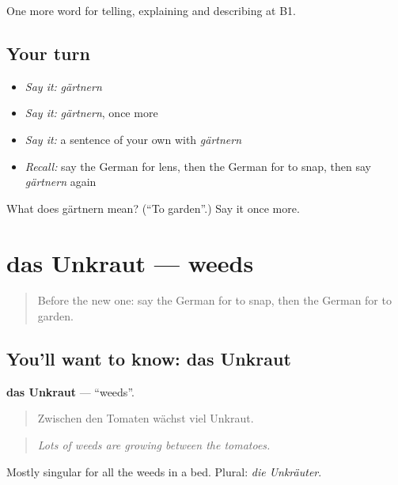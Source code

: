 \begin{grammarlens}[title={What you've built}]
One more word for telling, explaining and describing at B1.
\end{grammarlens}

\subsection*{Your turn}
\begin{itemize}
\raggedright
  \item \emph{Say it:} \emph{gärtnern}
  \item \emph{Say it:} \emph{gärtnern}, once more
  \item \emph{Say it:} a sentence of your own with \emph{gärtnern}
  \item \emph{Recall:} say the German for lens, then the German for to snap, then say \emph{gärtnern} again
\end{itemize}

\begin{tcolorbox}[breakable,colback=teal!4,colframe=teal!35!black,title={Before you move on}]
What does gärtnern mean? (\textquotedblleft{}To garden\textquotedblright{}.) Say it once more.
\end{tcolorbox}
\section[das Unkraut]{das Unkraut — weeds}

\label{lesson:GE-C503-unkraut}



\begin{quote}
Before the new one: say the German for to snap, then the German for to garden.
\end{quote}

\subsection*{You'll want to know: das Unkraut}
\textbf{das Unkraut} — \textquotedblleft{}weeds\textquotedblright{}.

\begin{quote}
Zwischen den Tomaten wächst viel Unkraut.
\end{quote}

\begin{quote}
\emph{Lots of weeds are growing between the tomatoes.}
\end{quote}

Mostly singular for all the weeds in a bed. Plural: \emph{die Unkräuter}.

